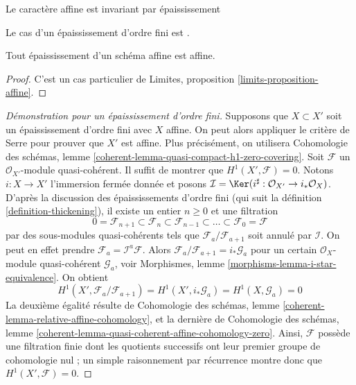 \begin{lemma}
\label{lemma-thickening-affine-scheme}
\begin{slogan}
Le caractère affine est invariant par épaississement
\end{slogan}
\begin{reference}
Le cas d'un épaississement d'ordre fini est \cite[Proposition 5.1.9]{EGA1}.
\end{reference}
Tout épaississement d'un schéma affine est affine.
\end{lemma}

\begin{proof}
C'est un cas particulier de
Limites, proposition \ref{limits-proposition-affine}.
\end{proof}

\begin{proof}[Démonstration pour un épaississement d'ordre fini]
Supposons que $X \subset X'$ soit un épaississement d'ordre fini avec $X$ affine.
On peut alors appliquer le critère de Serre pour prouver que $X'$ est affine. Plus précisément,
on utilisera Cohomologie des schémas, lemme
\ref{coherent-lemma-quasi-compact-h1-zero-covering}. Soit $\mathcal{F}$ un
$\mathcal{O}_{X'}$-module quasi-cohérent. Il suffit de montrer que
$H^1(X', \mathcal{F}) = 0$. Notons $i : X \to X'$ l'immersion fermée donnée
et posons
$\mathcal{I} = \Ker(i^\sharp : \mathcal{O}_{X'} \to i_*\mathcal{O}_X)$.
D'après la discussion des épaississements d'ordre fini (qui suit
la définition \ref{definition-thickening}), il existe un entier $n \geq 0$
et une filtration
$$
0 = \mathcal{F}_{n + 1} \subset \mathcal{F}_n \subset
\mathcal{F}_{n - 1} \subset \ldots \subset
\mathcal{F}_0 = \mathcal{F}
$$
par des sous-modules quasi-cohérents tels que $\mathcal{F}_a/\mathcal{F}_{a + 1}$ soit
annulé par $\mathcal{I}$. On peut en effet prendre
$\mathcal{F}_a = \mathcal{I}^a\mathcal{F}$. Alors
$\mathcal{F}_a/\mathcal{F}_{a + 1} = i_*\mathcal{G}_a$ pour un certain
$\mathcal{O}_X$-module quasi-cohérent $\mathcal{G}_a$, voir Morphismes, lemme
\ref{morphisms-lemma-i-star-equivalence}. On obtient
$$
H^1(X', \mathcal{F}_a/\mathcal{F}_{a + 1}) =
H^1(X', i_*\mathcal{G}_a) = H^1(X, \mathcal{G}_a) = 0
$$
La deuxième égalité résulte de Cohomologie des schémas, lemme
\ref{coherent-lemma-relative-affine-cohomology},
et la dernière de Cohomologie des schémas, lemme
\ref{coherent-lemma-quasi-coherent-affine-cohomology-zero}.
Ainsi, $\mathcal{F}$ possède une filtration finie dont les quotients successifs
ont leur premier groupe de cohomologie nul ; un simple
raisonnement par récurrence montre donc que $H^1(X', \mathcal{F}) = 0$.
\end{proof}

